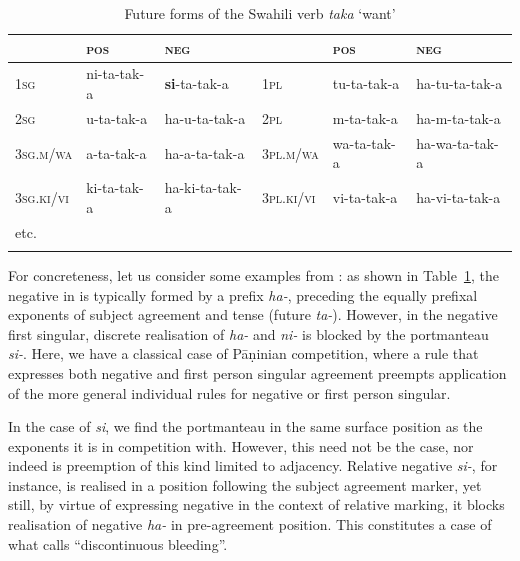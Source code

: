 \documentclass[output=paper
 	        ,biblatex
                ,babelshorthands
                ,newtxmath
                ,draftmode
                ,colorlinks, citecolor=brown
]{langscibook}
\begin{document}
\begin{exe}
\begin{xlist}
\begin{exe}
\begin{xlist}

\begin{table}
\setlength{\tabcolsep}{.3em}
\centering
\begin{tabular}{llllll}
\lsptoprule 
 & \textsc{pos} & \textsc{neg}     &             & \textsc{pos} & \textsc{neg}\\
\midrule 
\textsc{1sg} & ni-{ta}-tak-{a} & \textbf{{si}}-{ta}-tak-{a}        & \textsc{1pl} & tu-{ta}-tak-{a}     & {ha}-tu-{ta}-tak-{a}\\
\textsc{2sg} & u-{ta}-tak-{a} & {ha}-u-{ta}-tak-{a}        & \textsc{2pl} & m-{ta}-tak-{a}      & {ha}-m-{ta}-tak-{a}\\
\textsc{3sg.m/wa} & a-{ta}-tak-{a} & {ha}-a-{ta}-tak-{a}    & \textsc{3pl.m/wa} & wa-{ta}-tak-{a} & {ha}-wa-{ta}-tak-{a}\\ 
\textsc{3sg.ki/vi} & ki-{ta}-tak-{a} & {ha}-ki-{ta}-tak-{a} & \textsc{3pl.ki/vi} & vi-{ta}-tak-{a} & {ha}-vi-{ta}-tak-{a}\\
etc. & &\\
\lspbottomrule
\end{tabular}
\caption{Future forms of the Swahili verb  \textit{taka} ‘want’}
\label{tab:SwahiliPortmanteau}
\end{table}

For concreteness, let us consider some examples from : as shown
in Table~\ref{tab:SwahiliPortmanteau}, the negative in  is
typically formed by a prefix \textit{ha-}, preceding the equally
prefixal exponents of
subject agreement and tense (future \textit{ta-}). However, in the
negative first singular, discrete realisation of \textit{ha-} and
\textit{ni-} is blocked by the portmanteau \textit{si-}. Here, we have
a classical case of   Pāṇinian competition, where a rule that
expresses both negative and first person singular agreement preempts
application of the more general individual rules for negative or first
person singular.  



In the case of \textit{si}, we find the portmanteau in the same
surface position as the exponents it is in competition with.  However,
this need not be the case, nor indeed is preemption of this kind
limited to adjacency. Relative negative \textit{si-}, for instance, is
realised in a position following the subject agreement marker, yet
still, by virtue of expressing negative in the context of relative
marking, it blocks realisation of negative \textit{ha-} in
pre-agreement position. This constitutes a case of what
\citet{Noyer92} calls ``discontinuous bleeding''.


\end{xlist}
\end{exe}
\end{xlist}
\end{exe}
\end{document}
